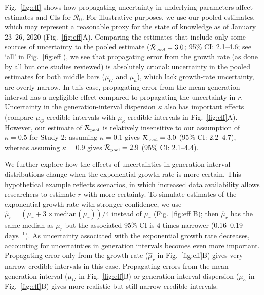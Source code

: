 \documentclass[12pt]{article}
\newcommand{\fref}[1]{Fig.~\ref{fig:#1}}
\newcommand{\Ro}{\ensuremath{{\mathcal R}_{0}}\xspace}
\newcommand{\Rpool}{\ensuremath{{\mathcal R}_{\textrm{\tiny{pool}}}}\xspace}
\providecommand{\DIFaddtex}[1]{{\protect\color{blue}\uwave{#1}}} %
\providecommand{\DIFdeltex}[1]{{\protect\color{red}\sout{#1}}}                      %
\providecommand{\DIFaddbegin}{} %
\providecommand{\DIFaddend}{} %
\providecommand{\DIFdelbegin}{} %
\providecommand{\DIFdelend}{} %
\providecommand{\DIFadd}[1]{\texorpdfstring{\DIFaddtex{#1}}{#1}} %
\providecommand{\DIFdel}[1]{\texorpdfstring{\DIFdeltex{#1}}{}} %
\newcommand{\DIFscaledelfig}{0.5}
\newlength{\DIFdelgraphicswidth} %
\newlength{\DIFdelgraphicsheight} %
\newcommand{\DIFaddincludegraphics}[2][]{{\color{blue}\fbox{\DIFOincludegraphics[#1]{#2}}}} %
\newcommand{\DIFdelincludegraphics}[2][]{%
\sbox{\DIFdelgraphicsbox}{\DIFOincludegraphics[#1]{#2}}%
\settoboxwidth{\DIFdelgraphicswidth}{\DIFdelgraphicsbox} %
\settoboxtotalheight{\DIFdelgraphicsheight}{\DIFdelgraphicsbox} %
\scalebox{\DIFscaledelfig}{%
\parbox[b]{\DIFdelgraphicswidth}{\usebox{\DIFdelgraphicsbox}\\[-\baselineskip] \rule{\DIFdelgraphicswidth}{0em}}\llap{\resizebox{\DIFdelgraphicswidth}{\DIFdelgraphicsheight}{%
\setlength{\unitlength}{\DIFdelgraphicswidth}%
\begin{picture}(1,1)%
\thicklines\linethickness{2pt} %
{\color[rgb]{1,0,0}\put(0,0){\framebox(1,1){}}}%
{\color[rgb]{1,0,0}\put(0,0){\line( 1,1){1}}}%
{\color[rgb]{1,0,0}\put(0,1){\line(1,-1){1}}}%
\end{picture}%
}\hspace*{3pt}}} %
} %
\DeclareRobustCommand{\DIFaddbegin}{\DIFOaddbegin \let\includegraphics\DIFaddincludegraphics} %
\DeclareRobustCommand{\DIFaddend}{\DIFOaddend \let\includegraphics\DIFOincludegraphics} %
\DeclareRobustCommand{\DIFdelbegin}{\DIFOdelbegin \let\includegraphics\DIFdelincludegraphics} %
\DeclareRobustCommand{\DIFdelend}{\DIFOaddend \let\includegraphics\DIFOincludegraphics} %
\begin{document}
\fref{eff} shows how propagating uncertainty in underlying parameters affect estimates and CIs for \Ro. 
For illustrative purposes, we use our pooled estimates, which may represent a reasonable proxy for the state of knowledge as of January 23--26, 2020 (\fref{eff}A).
Comparing the estimates that include only some sources of uncertainty to the pooled estimate ($\Rpool = 3.0$; 95\% CI: 2.1--4.6; see `all' in \fref{eff}), we see that propagating error from the growth rate (as done by all but one studies reviewed) is absolutely crucial: uncertainty in the pooled estimates for both middle bars ($\mu_G$ and $\mu_\kappa$), which lack growth-rate uncertainty, are overly narrow.
In this case, propagating error from the mean generation interval has a negligible effect compared to propagating the uncertainty in $r$.
Uncertainty in the generation-interval dispersion $\kappa$ also has important effects (compare $\mu_G$ credible intervals with $\mu_\kappa$ credible intervals in \fref{eff}A).
However, our estimate of \Rpool is relatively insensitive to our assumption of $\kappa=0.5$ for Study 2: assuming $\kappa=0.1$ gives $\Rpool = 3.0$ (95\% CI: 2.2--4.7), whereas assuming $\kappa=0.9$ gives $\Rpool = 2.9$ (95\% CI: 2.1--4.4).

We further explore how the effects of uncertainties in generation-interval distributions change when the exponential growth rate is more certain.
This hypothetical example reflects scenarios, in which increased data availability allows researchers to estimate $r$ with more certainty.
To simulate estimates of the exponential growth rate with \DIFdelbegin \DIFdel{stronger confidence}\DIFdelend \DIFaddbegin \DIFadd{narrower uncertainty}\DIFaddend , we use $\hat{\mu}_r = (\mu_r + 3\times\mathrm{median}(\mu_r))/4$ instead of $\mu_r$ (\fref{eff}B); 
then $\hat{\mu}_r$ has the same median as $\mu_r$ but the associated 95\% CI is 4 times narrower (0.16--0.19 $\textrm{days}^{-1}$).
As uncertainty associated with the exponential growth rate decreases, accounting for uncertainties in generation intervals becomes even more important.
Propagating error only from the growth rate ($\hat{\mu}_r$ in \fref{eff}B) gives very narrow credible intervals in this case. 
Propagating errors from the mean generation interval ($\mu_G$ in \fref{eff}B) or generation-interval dispersion ($\mu_\kappa$ in \fref{eff}B) gives more realistic but still narrow credible intervals.
\end{document}
